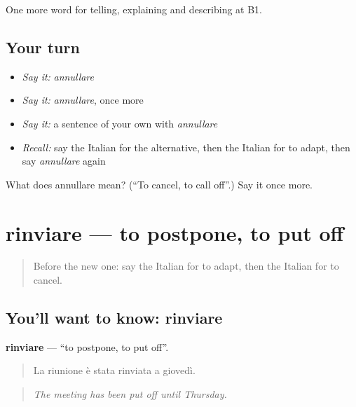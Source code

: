 \begin{grammarlens}[title={What you've built}]
One more word for telling, explaining and describing at B1.
\end{grammarlens}

\subsection*{Your turn}
\begin{itemize}
\raggedright
  \item \emph{Say it:} \emph{annullare}
  \item \emph{Say it:} \emph{annullare}, once more
  \item \emph{Say it:} a sentence of your own with \emph{annullare}
  \item \emph{Recall:} say the Italian for the alternative, then the Italian for to adapt, then say \emph{annullare} again
\end{itemize}

\begin{tcolorbox}[breakable,colback=teal!4,colframe=teal!35!black,title={Before you move on}]
What does annullare mean? (\textquotedblleft{}To cancel, to call off\textquotedblright{}.) Say it once more.
\end{tcolorbox}
\section[rinviare]{rinviare — to postpone, to put off}

\label{lesson:IT-C375-rinviare}



\begin{quote}
Before the new one: say the Italian for to adapt, then the Italian for to cancel.
\end{quote}

\subsection*{You'll want to know: rinviare}
\textbf{rinviare} — \textquotedblleft{}to postpone, to put off\textquotedblright{}.

\begin{quote}
La riunione è stata rinviata a giovedì.
\end{quote}

\begin{quote}
\emph{The meeting has been put off until Thursday.}
\end{quote}

